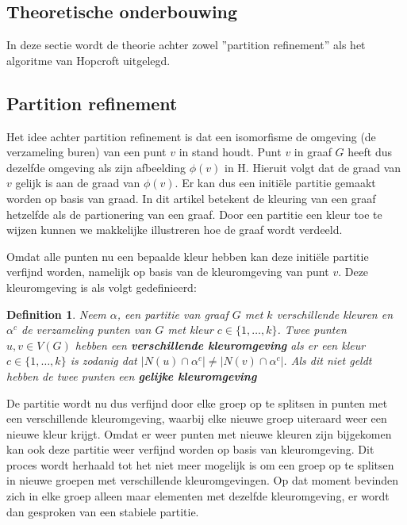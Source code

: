 \documentclass[twoside]{article}
\newtheorem{definition}{Definition}[section]
\begin{document}
\begin{multicols}{2}
\section{Theoretische onderbouwing}
In deze sectie wordt de theorie achter zowel ''partition refinement'' als het algoritme van Hopcroft uitgelegd.

\subsection{Partition refinement}
Het idee achter partition refinement is dat een isomorfisme de omgeving (de verzameling buren) van een punt $v$ in stand houdt. Punt $v$ in graaf $G$ heeft dus dezelfde omgeving als zijn afbeelding $\phi(v)$ in H. Hieruit volgt dat de graad van $v$ gelijk is aan de graad van $\phi(v)$. Er kan dus een initi\"ele partitie gemaakt worden op basis van graad. In dit artikel betekent de kleuring van een graaf hetzelfde als de partionering van een graaf. Door een partitie een kleur toe te wijzen kunnen we makkelijke illustreren hoe de graaf wordt verdeeld.

Omdat alle punten nu een bepaalde kleur hebben kan deze initi\"ele partitie verfijnd worden, namelijk op basis van de kleuromgeving van punt $v$. Deze kleuromgeving is als volgt gedefinieerd:

\begin{definition}
Neem $\alpha$, een partitie van graaf $G$ met $k$ verschillende kleuren en  $\alpha^{c}$ de verzameling punten van $G$ met kleur $c \in \{1,\ldots,k\}$. Twee punten $u,v \in V(G)$ hebben een \textbf{verschillende kleuromgeving} als er een kleur $c \in \{1,\ldots,k\}$ is zodanig dat $|N(u)\cap\alpha^{c}| \neq |N(v)\cap\alpha^{c}|$. Als dit niet geldt hebben de twee punten een \textbf{gelijke kleuromgeving}
\cite{slides_DFA}
\end{definition}


De partitie wordt nu dus verfijnd door elke groep op te splitsen in punten met een verschillende kleuromgeving, waarbij elke nieuwe groep uiteraard weer een nieuwe kleur krijgt. Omdat er weer punten met nieuwe kleuren zijn bijgekomen kan ook deze partitie weer verfijnd worden op basis van kleuromgeving. Dit proces wordt herhaald tot het niet meer mogelijk is om een groep op te splitsen in nieuwe groepen met verschillende kleuromgevingen. Op dat moment bevinden zich in elke groep alleen maar elementen met dezelfde kleuromgeving, er wordt dan gesproken van een stabiele partitie.


\end{multicols}
\end{document}
